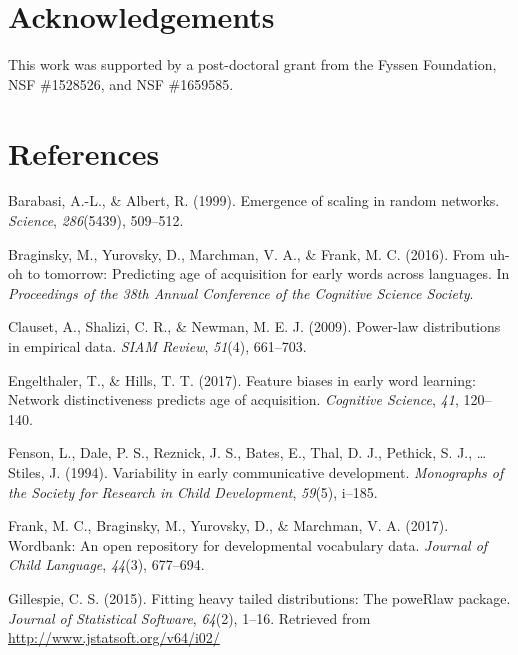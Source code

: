 \documentclass[10pt, letterpaper]{article}
\begin{document}
\section{Acknowledgements}\label{acknowledgements}

This work was supported by a post-doctoral grant from the Fyssen
Foundation, NSF \#1528526, and NSF \#1659585.

\section{References}\label{references}

\setlength{\parindent}{-0.1in} \setlength{\leftskip}{0.125in} \noindent

\hypertarget{refs}{}
\hypertarget{ref-barabasi99}{}
Barabasi, A.-L., \& Albert, R. (1999). Emergence of scaling in random
networks. \emph{Science}, \emph{286}(5439), 509--512.

\hypertarget{ref-braginsky2016}{}
Braginsky, M., Yurovsky, D., Marchman, V. A., \& Frank, M. C. (2016).
From uh-oh to tomorrow: Predicting age of acquisition for early words
across languages. In \emph{Proceedings of the 38th Annual Conference of
the Cognitive Science Society}.

\hypertarget{ref-clauset09}{}
Clauset, A., Shalizi, C. R., \& Newman, M. E. J. (2009). Power-law
distributions in empirical data. \emph{SIAM Review}, \emph{51}(4),
661--703.

\hypertarget{ref-engelthaler2017}{}
Engelthaler, T., \& Hills, T. T. (2017). Feature biases in early word
learning: Network distinctiveness predicts age of acquisition.
\emph{Cognitive Science}, \emph{41}, 120--140.

\hypertarget{ref-fenson94}{}
Fenson, L., Dale, P. S., Reznick, J. S., Bates, E., Thal, D. J.,
Pethick, S. J., \ldots{} Stiles, J. (1994). Variability in early
communicative development. \emph{Monographs of the Society for Research
in Child Development}, \emph{59}(5), i--185.

\hypertarget{ref-frank2017}{}
Frank, M. C., Braginsky, M., Yurovsky, D., \& Marchman, V. A. (2017).
Wordbank: An open repository for developmental vocabulary data.
\emph{Journal of Child Language}, \emph{44}(3), 677--694.

\hypertarget{ref-gillespie15}{}
Gillespie, C. S. (2015). Fitting heavy tailed distributions: The
poweRlaw package. \emph{Journal of Statistical Software}, \emph{64}(2),
1--16. Retrieved from \url{http://www.jstatsoft.org/v64/i02/}
\end{document}
